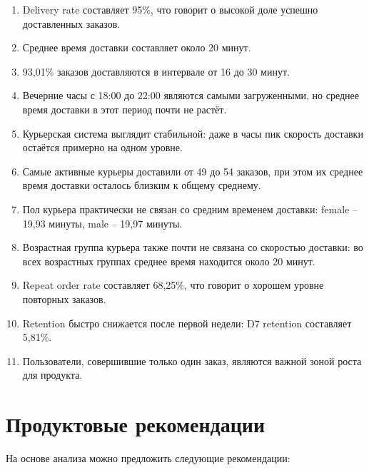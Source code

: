 \documentclass[12pt,a4paper]{article}
\begin{document}
\begin{enumerate}
    \item Delivery rate составляет 95\%, что говорит о высокой доле успешно доставленных заказов.
    \item Среднее время доставки составляет около 20 минут.
    \item 93,01\% заказов доставляются в интервале от 16 до 30 минут.
    \item Вечерние часы с 18:00 до 22:00 являются самыми загруженными, но среднее время доставки в этот период почти не растёт.
    \item Курьерская система выглядит стабильной: даже в часы пик скорость доставки остаётся примерно на одном уровне.
    \item Самые активные курьеры доставили от 49 до 54 заказов, при этом их среднее время доставки осталось близким к общему среднему.
    \item Пол курьера практически не связан со средним временем доставки: female -- 19,93 минуты, male -- 19,97 минуты.
    \item Возрастная группа курьера также почти не связана со скоростью доставки: во всех возрастных группах среднее время находится около 20 минут.
    \item Repeat order rate составляет 68,25\%, что говорит о хорошем уровне повторных заказов.
    \item Retention быстро снижается после первой недели: D7 retention составляет 5,81\%.
    \item Пользователи, совершившие только один заказ, являются важной зоной роста для продукта.
\end{enumerate}
\newpage
\section{Продуктовые рекомендации}

На основе анализа можно предложить следующие рекомендации:
\end{document}
